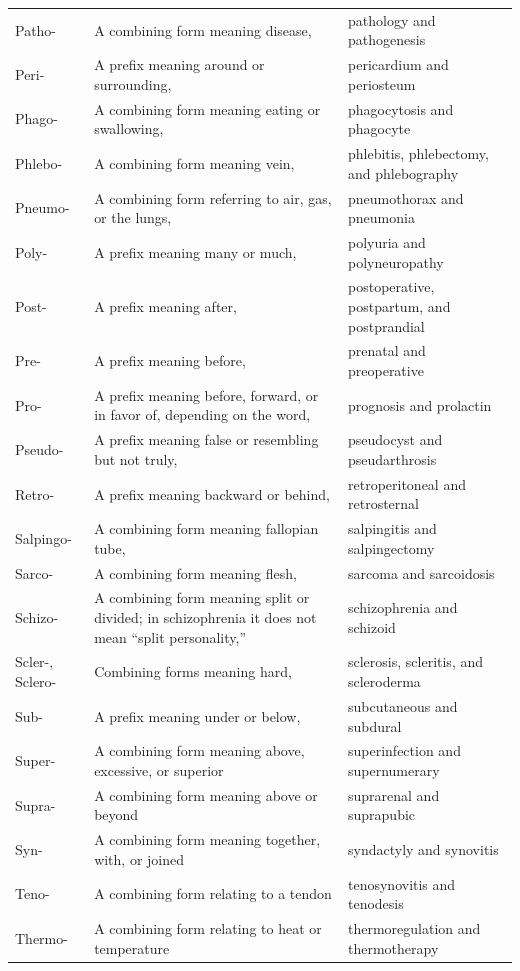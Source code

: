 \begin{longtable}{>{\raggedright\arraybackslash}p{} >{\raggedright\arraybackslash}p{} >{\raggedright\arraybackslash}p{}}
Patho- & A combining form meaning disease, & pathology and pathogenesis \\
Peri- & A prefix meaning around or surrounding, & pericardium and periosteum \\
Phago- & A combining form meaning eating or swallowing, & phagocytosis and phagocyte \\
Phlebo- & A combining form meaning vein, & phlebitis, phlebectomy, and phlebography \\
Pneumo- & A combining form referring to air, gas, or the lungs, & pneumothorax and pneumonia \\
Poly- & A prefix meaning many or much, & polyuria and polyneuropathy \\
Post- & A prefix meaning after, & postoperative, postpartum, and postprandial \\
Pre- & A prefix meaning before, & prenatal and preoperative \\
Pro- & A prefix meaning before, forward, or in favor of, depending on the word, & prognosis and prolactin \\
Pseudo- & A prefix meaning false or resembling but not truly, & pseudocyst and pseudarthrosis \\
Retro- & A prefix meaning backward or behind, & retroperitoneal and retrosternal \\
Salpingo- & A combining form meaning fallopian tube, & salpingitis and salpingectomy \\
Sarco- & A combining form meaning flesh, & sarcoma and sarcoidosis \\
Schizo- & A combining form meaning split or divided; in schizophrenia it does not mean “split personality,” & schizophrenia and schizoid \\
Scler-, Sclero- & Combining forms meaning hard, & sclerosis, scleritis, and scleroderma \\
Sub- & A prefix meaning under or below, & subcutaneous and subdural \\
Super- & A combining form meaning above, excessive, or superior & superinfection and supernumerary \\
Supra- & A combining form meaning above or beyond & suprarenal and suprapubic \\
Syn- & A combining form meaning together, with, or joined & syndactyly and synovitis \\
Teno- & A combining form relating to a tendon & tenosynovitis and tenodesis \\
Thermo- & A combining form relating to heat or temperature & thermoregulation and thermotherapy \\

\end{longtable}
